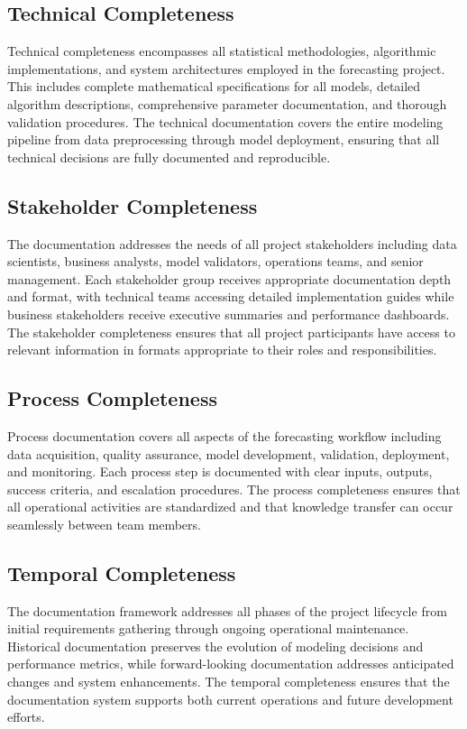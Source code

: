 		\subsection{Technical Completeness}
		Technical completeness encompasses all statistical methodologies, algorithmic implementations, and system architectures employed in the forecasting project. This includes complete mathematical specifications for all models, detailed algorithm descriptions, comprehensive parameter documentation, and thorough validation procedures. The technical documentation covers the entire modeling pipeline from data preprocessing through model deployment, ensuring that all technical decisions are fully documented and reproducible.
		
		\subsection{Stakeholder Completeness}
		The documentation addresses the needs of all project stakeholders including data scientists, business analysts, model validators, operations teams, and senior management. Each stakeholder group receives appropriate documentation depth and format, with technical teams accessing detailed implementation guides while business stakeholders receive executive summaries and performance dashboards. The stakeholder completeness ensures that all project participants have access to relevant information in formats appropriate to their roles and responsibilities.
		
		\subsection{Process Completeness}
		Process documentation covers all aspects of the forecasting workflow including data acquisition, quality assurance, model development, validation, deployment, and monitoring. Each process step is documented with clear inputs, outputs, success criteria, and escalation procedures. The process completeness ensures that all operational activities are standardized and that knowledge transfer can occur seamlessly between team members.
		
		\subsection{Temporal Completeness}
		The documentation framework addresses all phases of the project lifecycle from initial requirements gathering through ongoing operational maintenance. Historical documentation preserves the evolution of modeling decisions and performance metrics, while forward-looking documentation addresses anticipated changes and system enhancements. The temporal completeness ensures that the documentation system supports both current operations and future development efforts.
		
